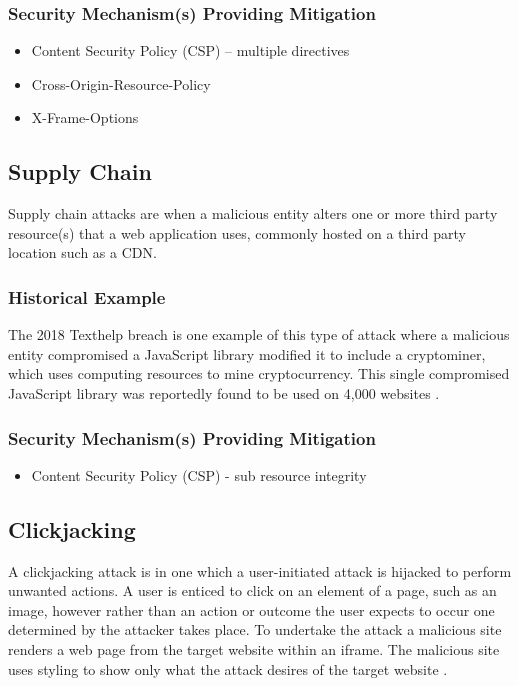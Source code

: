 \documentclass{mscreport}
\begin{document}
\subsubsection{Security Mechanism(s) Providing Mitigation}

\begin{itemize}
	\setlength\itemsep{0.1em}
	\item Content Security Policy (CSP) – multiple directives
	\item Cross-Origin-Resource-Policy
	\item X-Frame-Options
\end{itemize}


\subsection{Supply Chain}

Supply chain attacks are when a malicious entity alters one or more third party resource(s) that a web application uses, commonly hosted on a third party location such as a CDN.

\subsubsection{Historical Example}
The 2018 Texthelp breach is one example of this type of attack where a malicious entity compromised a JavaScript library modified it to include a cryptominer, which uses computing resources to mine cryptocurrency. This single compromised JavaScript library was reportedly found to be used on 4,000 websites \cite{Billman2018-sq}.

\subsubsection{Security Mechanism(s) Providing Mitigation}

\begin{itemize}
	\setlength\itemsep{0.1em}
	\item Content Security Policy (CSP) - sub resource integrity
\end{itemize}

\subsection{Clickjacking}

A clickjacking attack is in one which a user-initiated attack is hijacked to perform unwanted actions. A user is enticed to click on an element of a page, such as an image, however rather than an action or outcome the user expects to occur one determined by the attacker takes place. To undertake the attack a malicious site renders a web page from the target website within an iframe. The malicious site uses styling to show only what the attack desires of the target website \cite{Jamwal2018-tz}.
\end{document}
